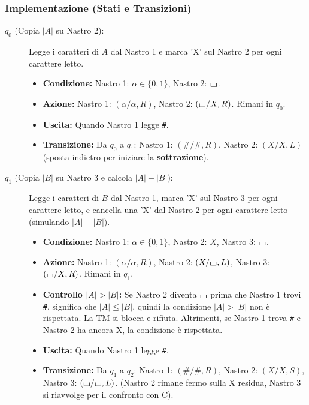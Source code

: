 \documentclass[a4paper]{article}
\theoremstyle{definition} %
\newcommand{\blankS}{\ensuremath{\raisebox{-0.15ex}{\scalebox{1.3}[0.7]{$\sqcup$}}}}
\begin{document}
\subsubsection{Implementazione (Stati e Transizioni)}
\begin{description}
    \item[$q_0$ (Copia $|A|$ su Nastro 2):] Legge i caratteri di $A$ dal Nastro 1 e marca 'X' sul Nastro 2 per ogni carattere letto.
    \begin{itemize}
        \item \textbf{Condizione:} Nastro 1: $\alpha \in \{0,1\}$, Nastro 2: $\blankS$.
        \item \textbf{Azione:} Nastro 1: $(\alpha/\alpha, R)$, Nastro 2: $(\blankS/X, R)$. Rimani in $q_0$.
        \item \textbf{Uscita:} Quando Nastro 1 legge \texttt{\#}.
        \item \textbf{Transizione:} Da $q_0$ a $q_1$: Nastro 1: $(\texttt{\#}/\texttt{\#}, R)$, Nastro 2: $(X/X, L)$ (sposta indietro per iniziare la \textbf{sottrazione}).
    \end{itemize}
    \item[$q_1$ (Copia $|B|$ su Nastro 3 e calcola $|A|-|B|$):] Legge i caratteri di $B$ dal Nastro 1, marca 'X' sul Nastro 3 per ogni carattere letto, e cancella una 'X' dal Nastro 2 per ogni carattere letto (simulando $|A|-|B|$).
    \begin{itemize}
        \item \textbf{Condizione:} Nastro 1: $\alpha \in \{0,1\}$, Nastro 2: $X$, Nastro 3: $\blankS$.
        \item \textbf{Azione:} Nastro 1: $(\alpha/\alpha, R)$, Nastro 2: $(X/\blankS, L)$, Nastro 3: $(\blankS/X, R)$. Rimani in $q_1$.
        \item \textbf{Controllo $|A|>|B|$:} Se Nastro 2 diventa $\blankS$ prima che Nastro 1 trovi \texttt{\#}, significa che $|A| \le |B|$, quindi la condizione $|A|>|B|$ non è rispettata. La TM si blocca e rifiuta. Altrimenti, se Nastro 1 trova \texttt{\#} e Nastro 2 ha ancora X, la condizione è rispettata.
        \item \textbf{Uscita:} Quando Nastro 1 legge \texttt{\#}.
        \item \textbf{Transizione:} Da $q_1$ a $q_2$: Nastro 1: $(\texttt{\#}/\texttt{\#}, R)$, Nastro 2: $(X/X, S)$, Nastro 3: $(\blankS/\blankS, L)$. (Nastro 2 rimane fermo sulla X residua, Nastro 3 si riavvolge per il confronto con C).
    \end{itemize}

\end{description}
\end{document}
